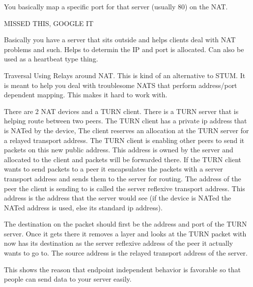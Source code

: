 \documentclass[12pt]{article}
\begin{document}

You basically map a specific port for that server (usually 80) on the NAT.


MISSED THIS, GOOGLE IT


Basically you have a server that sits outside and helps clients deal with NAT problems and such. Helps to determin the IP and port is allocated. Can also be used as a heartbeat type thing. 


Traversal Using Relays around NAT. This is kind of an alternative to STUM. It is meant to help you deal with troublesome NATS that perform address/port dependent mapping. This makes it hard to work with.


There are 2 NAT devices and a TURN client. There is a TURN server that is helping route between two peers. The TURN client has a private ip address that is NATed by the device, The client reserves an allocation at the TURN server for a relayed transport address. The TURN client is enabling other peers to send it packets on this new public address. This address is owned by the server and allocated to the client and packets will be forwarded there. If the TURN client wants to send packets to a peer it encapsulates the packets with a server transport address and sends them to the server for routing. The address of the peer the client is sending to is called the server reflexive transport address. This address is the address that the server would see (if the device is NATed the NATed address is used, else its standard ip address).   


The destination on the packet should first be the address and port of the TURN server. Once it gets there it removes a layer and looks at the TURN packet with now has its destination as the server reflexive address of the peer it actually wants to go to. The source address is the relayed transport address of the server. 


This shows the reason that endpoint independent behavior is favorable so that people can send data to your server easily. 


\end{document}
